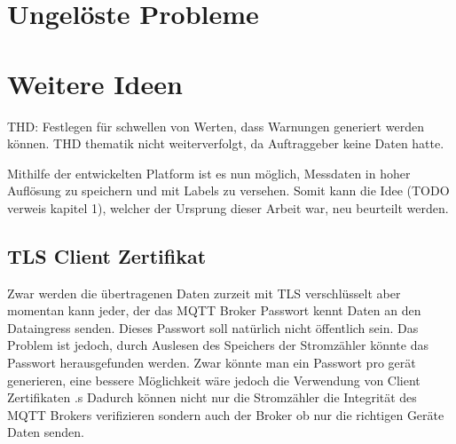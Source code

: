 \section{Ungelöste Probleme}



\section{Weitere Ideen}
THD: Festlegen für schwellen von Werten, dass Warnungen generiert werden können.
THD thematik nicht weiterverfolgt, da Auftraggeber keine Daten hatte.

Mithilfe der entwickelten Platform ist es nun möglich, Messdaten in hoher Auflösung zu speichern
und mit Labels zu versehen. Somit kann die Idee (TODO verweis kapitel 1), welcher der Ursprung dieser
Arbeit war, neu beurteilt werden.

\subsection{\ac{TLS} Client Zertifikat}

Zwar werden die übertragenen Daten zurzeit mit \ac{TLS} verschlüsselt aber
momentan kann jeder, der das \ac{MQTT} Broker Passwort kennt Daten an den
Dataingress senden. Dieses Passwort soll natürlich nicht öffentlich sein.
Das Problem ist jedoch, durch Auslesen des Speichers der Stromzähler
könnte das Passwort herausgefunden werden.
Zwar könnte man ein Passwort pro gerät generieren, eine bessere Möglichkeit
wäre jedoch die Verwendung von Client Zertifikaten \parencite{rfc5246_2021}.s
Dadurch können nicht nur die Stromzähler die Integrität des \ac{MQTT} Brokers
verifizieren sondern auch der Broker ob nur die richtigen Geräte
Daten senden.


